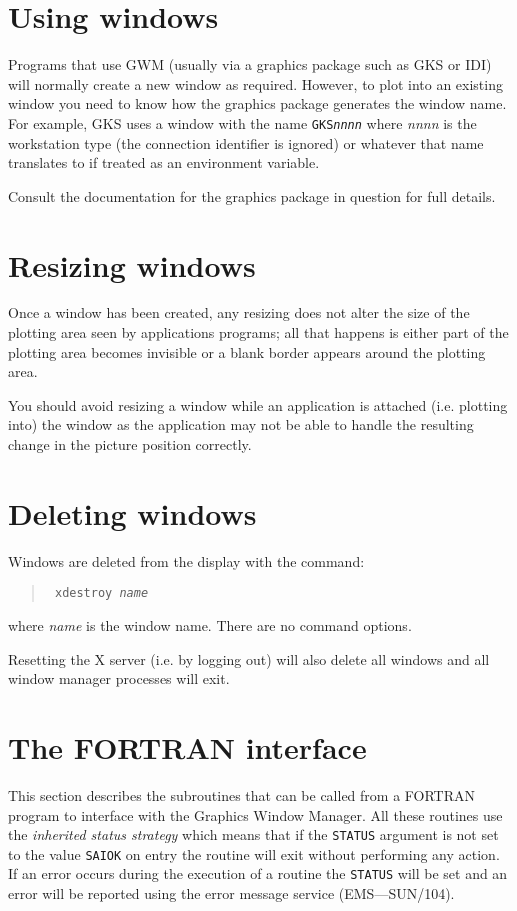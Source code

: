 \documentclass[twoside,11pt]{article}
\newcommand{\xref}[3]{#1}
\newcommand{\xlabel}[1]{}
\renewcommand{\_}{\texttt{\symbol{95}}}
\begin{document}
\section{Using windows}

Programs that use GWM (usually via a graphics package such as GKS or IDI) will
normally create a new window as required. However, to plot into an existing
window you need to know how the graphics package generates the window name. For
example, GKS  uses a window with the name {\tt GKS\_{\em{nnnn}}} where {\em
nnnn} is the workstation type (the connection identifier is ignored) or
whatever that name translates to if treated as an environment variable.

Consult the documentation for the graphics package in question for full
details.

\section{Resizing windows}
Once a window has been created, any resizing does not alter the size of the
plotting area seen by applications programs; all that happens is either part of
the plotting area becomes invisible or a blank border appears around the
plotting area.

You should avoid resizing a window while an application is attached (i.e.
plotting into) the window as the application may not be able to handle the
resulting change in the picture position correctly.

\section{Deleting windows\xlabel{xdestroyCommand}}
Windows are deleted from the display with the command:
\begin{quote}{\tt
xdestroy {\em name}}
\end{quote}
where {\em name} is the window name. There are no command options.

Resetting the X server (i.e. by logging out) will also delete all windows
and all window manager processes will exit.

\section{The FORTRAN interface}

This section describes the subroutines that can be called from a FORTRAN
program to interface with the Graphics Window Manager. All these routines
use the {\em inherited status strategy} which means that if the {\tt STATUS}
argument is not set to the value {\tt SAI\_\_OK} on entry the routine will
exit without performing any action. If an error occurs during the execution
of a routine the {\tt STATUS} will be set and an error will be reported
using the error message service
(EMS---\xref{SUN/104}{sun104}{}).
\end{document}
